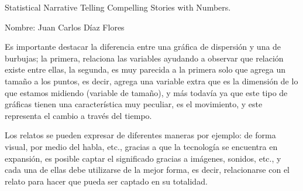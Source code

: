 \documentclass{article}\usepackage[]{graphicx}\usepackage[]{color}
\begin{document}
\raggedright

{ \setlength{\parskip}{3mm} \Large Statistical Narrative Telling Compelling Stories with Numbers.

Nombre: Juan Carlos D\'iaz Flores}

{\setlength{\parskip}{7mm} \large Es importante destacar la diferencia entre una gr\'afica de dispersi\'on y una de burbujas; la primera, relaciona las variables ayudando a observar que relaci\'on existe entre ellas, la segunda, es muy parecida a la primera solo que agrega un tama\~no a los puntos, es decir, agrega una variable extra que es la dimensi\'on de lo que estamos midiendo (variable de tama\~no), y m\'as todav\'ia ya que este tipo de gr\'aficas tienen una caracter\'istica muy peculiar, es el movimiento, y este representa el cambio a trav\'es del tiempo.}

{\setlength{\parskip}{7mm} \large Los relatos se pueden expresar de diferentes maneras por ejemplo: de forma visual, por medio del habla, etc., gracias a que la tecnolog\'ia se encuentra en expansi\'on, es posible captar el significado gracias a im\'agenes, sonidos, etc., y cada una de ellas debe utilizarse de la mejor forma, es decir, relacionarse con el relato para hacer que pueda ser captado en su totalidad. }
\end{document}

